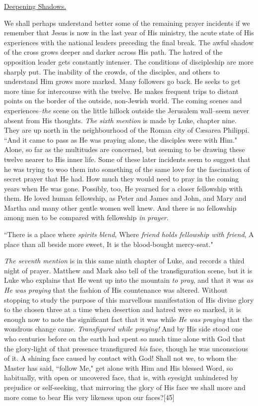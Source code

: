 \underline{Deepening Shadows.}


We shall perhaps understand better some of the remaining prayer incidents
if we remember that Jesus is now in the last year of His ministry, the
acute state of His experiences with the national leaders preceding the
final break. The awful shadow of the cross grows deeper and darker across
His path. The hatred of the opposition leader gets constantly intenser.
The conditions of discipleship are more sharply put. The inability of the
crowds, of the disciples, and others to understand Him grows more marked.
Many followers go back. He seeks to get more time for intercourse with
the twelve. He makes frequent trips to distant points on the border of the
outside, non-Jewish world. The coming scenes and experiences--\textit{the} scene
on the little hillock outside the Jerusalem wall--seem never absent from
His thoughts. \textit{The sixth mention} is made by Luke, chapter nine. They are
up north in the neighbourhood of the Roman city of Cæsarea Philippi. ``And
it came to pass as He was praying alone, the disciples were with Him."
Alone, so far as the multitudes are concerned, but seeming to be drawing
these twelve nearer to His inner life. Some of these later incidents seem
to suggest that he was trying to woo them into something of the same love
for the fascination of secret prayer that He had. How much they would need
to pray in the coming years when He was gone. Possibly, too, He yearned
for a closer fellowship with them. He loved human fellowship, as Peter and
James and John, and Mary and Martha and many other gentle women well knew.
And there is no fellowship among men to be compared with fellowship \textit{in
prayer}.

    ``There is a place where \textit{spirits blend},
    Where \textit{friend holds fellowship with friend},
    A place than all beside more sweet,
    It is the blood-bought mercy-seat."

\textit{The seventh mention} is in this same ninth chapter of Luke, and records a
third night of prayer. Matthew and Mark also tell of the transfiguration
scene, but it is Luke who explains that He went up into the mountain \textit{to
pray}, and that it was \textit{as He was praying} that the fashion of His
countenance was altered. Without stopping to study the purpose of this
marvellous manifestation of His divine glory to the chosen three at a time
when desertion and hatred were so marked, it is enough now to note the
significant fact that it was while \textit{He was praying} that the wondrous
change came. \textit{Transfigured while praying!} And by His side stood one who
centuries before on the earth had spent so much time alone with God that
the glory-light of that presence transfigured \textit{his} face, though he was
unconscious of it. A shining face caused by contact with God! Shall not
we, to whom the Master has said, ``follow Me," get alone with Him and His
blessed Word, so habitually, with open or uncovered face, that is, with
eyesight unhindered by prejudice or self-seeking, that mirroring the glory
of His face we shall more and more come to bear His very likeness upon our
faces?[45]

